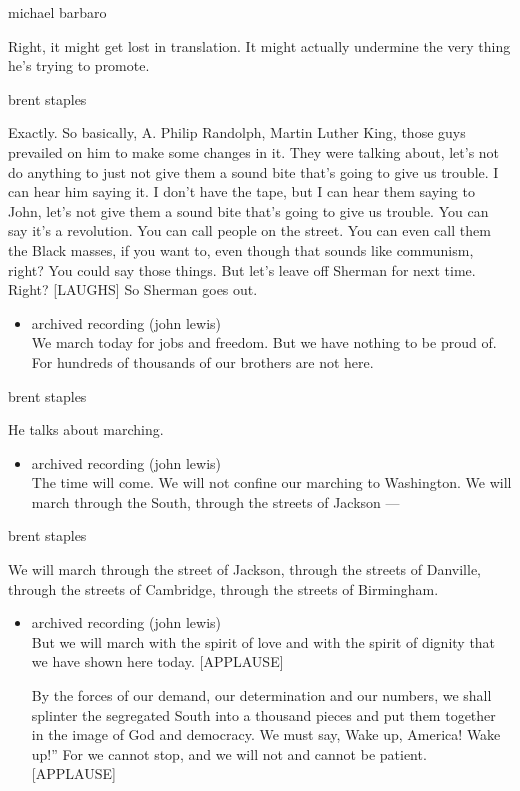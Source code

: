 michael barbaro

Right, it might get lost in translation. It might actually undermine the
very thing he's trying to promote.

brent staples

Exactly. So basically, A. Philip Randolph, Martin Luther King, those
guys prevailed on him to make some changes in it. They were talking
about, let's not do anything to just not give them a sound bite that's
going to give us trouble. I can hear him saying it. I don't have the
tape, but I can hear them saying to John, let's not give them a sound
bite that's going to give us trouble. You can say it's a revolution. You
can call people on the street. You can even call them the Black masses,
if you want to, even though that sounds like communism, right? You could
say those things. But let's leave off Sherman for next time. Right?
{[}LAUGHS{]} So Sherman goes out.

\begin{itemize}
\tightlist
\item
  archived recording (john lewis)\\
  We march today for jobs and freedom. But we have nothing to be proud
  of. For hundreds of thousands of our brothers are not here.
\end{itemize}

brent staples

He talks about marching.

\begin{itemize}
\tightlist
\item
  archived recording (john lewis)\\
  The time will come. We will not confine our marching to Washington. We
  will march through the South, through the streets of Jackson ---
\end{itemize}

brent staples

We will march through the street of Jackson, through the streets of
Danville, through the streets of Cambridge, through the streets of
Birmingham.

\begin{itemize}
\item
  archived recording (john lewis)\\
  But we will march with the spirit of love and with the spirit of
  dignity that we have shown here today. {[}APPLAUSE{]}

  By the forces of our demand, our determination and our numbers, we
  shall splinter the segregated South into a thousand pieces and put
  them together in the image of God and democracy. We must say, Wake up,
  America! Wake up!'' For we cannot stop, and we will not and cannot be
  patient. {[}APPLAUSE{]}
\end{itemize}

